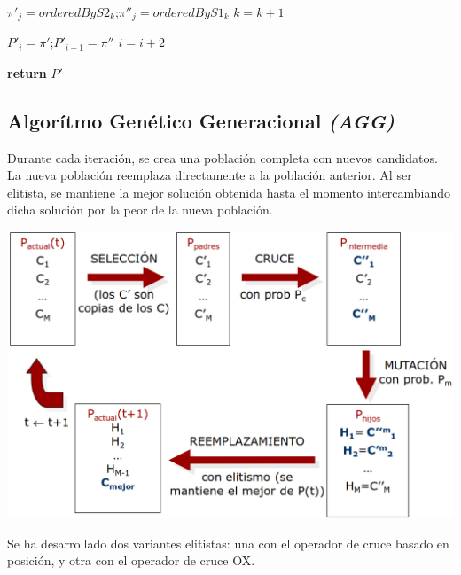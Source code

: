 \documentclass[a4paper, 12pt]{article}
\begin{document}
\begin{itemize}
\begin{algorithm}[H]
{{{         			$\pi'_j = orderedByS2_k$;\hspace*{0.5cm}$\pi''_j = orderedByS1_k$
         			$k = k+1$\\
         		}
         		
         		$P'_i = \pi'$;\hspace*{0.5cm}$P'_{i+1} = \pi''$
         		$i = i + 2$
         	}
                    
            
            \textbf{return} $P'$\\
         }
      \end{algorithm}
      	
      \end{itemize}
       
      
      \newpage
      \subsection{Algorítmo Genético Generacional \textit{(AGG)}}
      Durante cada iteración, se crea una población completa con nuevos candidatos. La nueva población reemplaza directamente a la población anterior. Al ser elitista, se mantiene la mejor solución obtenida hasta el momento intercambiando dicha solución por la peor de la nueva población.\\
      
      \begin{center}
      	\includegraphics[scale=0.3]{esquema-agg}
      \end{center}
      
      
      Se ha desarrollado dos variantes elitistas: una con el operador de cruce basado en posición, y otra con el operador de cruce OX.\\
      
\end{document}
